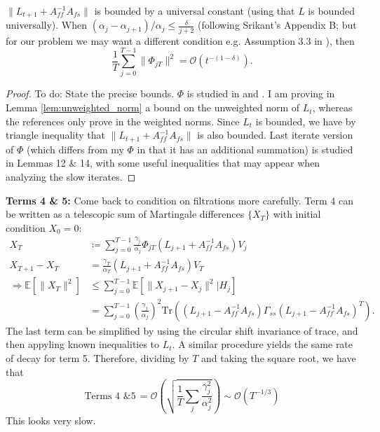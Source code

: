 \begin{proposition}
    $\lVert L_{t+1} + A_{ff}^{-1} A_{fs} \rVert$ is bounded by a universal constant (using that $L$ is bounded universally). 
    When $(\alpha_j - \alpha_{j+1})/\alpha_j \leq \frac{\delta}{j+2}$ (following Srikant's Appendix B; but for our problem we may want a different condition e.g. Assumption 3.3 in \citep{polyakJuditsky}), 
    then 
    \begin{equation}
        \frac{1}{T}\sum_{j=0}^{T-1} \lVert \Phi_{jT} \rVert^2 = \mathcal{O}(t^{-(1-\delta)}).
    \end{equation}
\end{proposition}
\begin{proof}
    {\color{red}To do: State the precise bounds.}
    $\Phi$ is studied in \citep{polyakJuditsky} and \citep{konda2004convergence}. 
    I am proving in Lemma \ref{lem:unweighted_norm} a bound on the unweighted norm of $L_t$, whereas the references \citep{konda2004convergence,kaledin2020finite} only prove in the weighted norms.
    Since $L_t$ is bounded, we have by triangle inequality that $\lVert L_{t+1} + A_{ff}^{-1} A_{fs} \rVert$ is also bounded. 
    Last iterate version of $\Phi$ (which differs from my $\Phi$ in that it has an additional summation) is studied in \citep{kaledin2020finite} Lemmas 12 \& 14, with some useful inequalities that may appear when analyzing the slow iterates. 
\end{proof}


\textbf{Terms 4 \& 5: }
{\color{red}Come back to condition on filtrations more carefully.}
Term 4 can be written as a telescopic sum of Martingale differences $\{X_T\}$ with initial condition $X_0 = 0$:
\begin{align*}
    X_T &\coloneqq \sum_{j=0}^{T-1} \frac{\gamma_j}{\alpha_j} \Phi_{jT} (L_{j+1} + A_{ff}^{-1} A_{fs}) V_j \\ 
    X_{T+1} - X_{T} &= \frac{\gamma_T}{\alpha_T} (L_{j+1} + A_{ff}^{-1} A_{fs})V_T
    \\
    \Rightarrow 
    \mathbb{E}[\lVert X_{T}\rVert^2 ] &\leq \sum_{j=0}^{T-1} \mathbb{E}[\lVert X_{j+1} - X_j \rVert^2 | H_j] 
    \\ &= \sum_{j=0}^{T-1} \left(\frac{\gamma_j}{\alpha_j}\right)^2 \mathrm{Tr}\left((L_{j+1} - A_{ff}^{-1} A_{fs}) \Gamma_{ss} (L_{j+1} - A_{ff}^{-1} A_{fs})^T\right) .
\end{align*}
The last term can be simplified by using the circular shift invariance of trace, and then appyling known inequalities to $L_t$.
A similar procedure yields the same rate of decay for term 5. 
Therefore, dividing by $T$ and taking the square root, we have that 
\begin{equation}
    \text{Terms 4 \& 5} \, = \mathcal{O}\left(
        \sqrt{\frac{1}{T} \sum_j \frac{\gamma_j^2}{\alpha_j^2}}
    \right)
    \sim \mathcal{O}(T^{-1/3})
\end{equation}
{\color{red}This looks very slow.}


